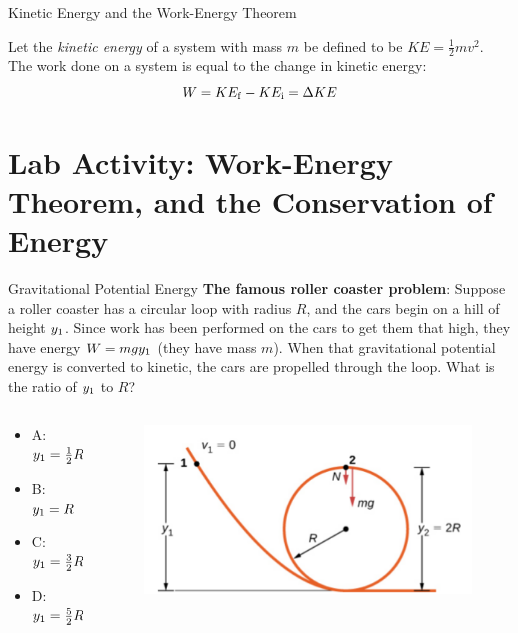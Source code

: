 \documentclass{beamer}
\begin{document}
\begin{frame}{Kinetic Energy and the Work-Energy Theorem}
\begin{tcolorbox}[colback=white,colframe=red!40!blue,title=The Work-Energy Theorem]
\small
\alert{
Let the \textit{kinetic energy} of a system with mass $m$ be defined to be $KE = \frac{1}{2}mv^2$.  The work done on a system is equal to the change in kinetic energy:
\begin{equation}
W = KE_{\rm f} - KE_{\rm i} = \Delta KE
\end{equation}
}
\end{tcolorbox}
\end{frame}

\section{Lab Activity: Work-Energy Theorem, and the Conservation of Energy}

\begin{frame}{Gravitational Potential Energy}
\textbf{The famous roller coaster problem}: Suppose a roller coaster has a circular loop with radius $R$, and the cars begin on a hill of height $y_{\rm 1}$.  Since work has been performed on the cars to get them that high, they have energy $W = mgy_{\rm 1}$ (they have mass $m$).  When that gravitational potential energy is converted to kinetic, the cars are propelled through the loop.  What is the ratio of $y_{\rm 1}$ to $R$? 
\begin{columns}[T]
\begin{column}{0.5\textwidth}
\begin{itemize}
\item A: $y_{\rm 1} = \frac{1}{2}R$
\item B: $y_{\rm 1} = R$
\item C: $y_{\rm 1} = \frac{3}{2}R$
\item D: $y_{\rm 1} = \frac{5}{2}R$
\end{itemize}
\end{column}
\begin{column}{0.5\textwidth}
\begin{figure}
\centering
\includegraphics[width=\textwidth]{figures/loop.png}
\end{figure}
\end{column}
\end{columns}
\end{frame}
\end{document}

